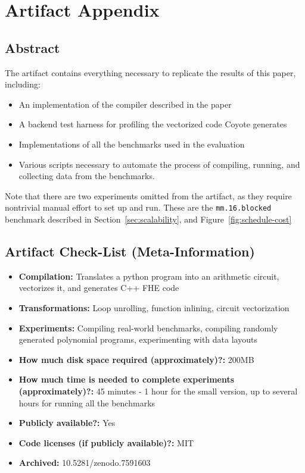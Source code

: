 \section{Artifact Appendix}

\subsection{Abstract}

The artifact contains everything necessary to replicate the results of this paper, including:
\begin{itemize}
    \item An implementation of the compiler described in the paper
    \item A backend test harness for profiling the vectorized code Coyote generates
    \item Implementations of all the benchmarks used in the evaluation
    \item Various scripts necessary to automate the process of compiling, running, and collecting data from the benchmarks.
\end{itemize}

Note that there are two experiments omitted from the artifact, as they require nontrivial manual effort to set up and run. These are the {\tt mm.16.blocked} benchmark described in Section~\ref{sec:scalability}, and Figure~\ref{fig:schedule-cost}

\subsection{Artifact Check-List (Meta-Information)}

{\small
\begin{itemize}
  \item {\bf Compilation: } Translates a python program into an arithmetic circuit, vectorizes it, and generates C++ FHE code
  \item {\bf Transformations: } Loop unrolling, function inlining, circuit vectorization
  \item {\bf Experiments: } Compiling real-world benchmarks, compiling randomly generated polynomial programs, experimenting with data layouts
  \item {\bf How much disk space required (approximately)?: } 200MB
  \item {\bf How much time is needed to complete experiments (approximately)?: } 45 minutes - 1 hour for the small version, up to several hours for running all the benchmarks
  \item {\bf Publicly available?: } Yes
  \item {\bf Code licenses (if publicly available)?: } MIT
  \item {\bf Archived: } 10.5281/zenodo.7591603
  
\end{itemize}
}

